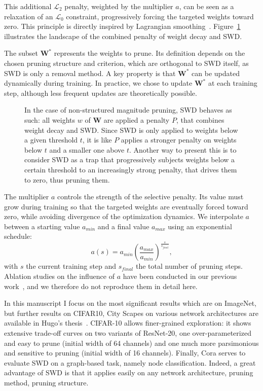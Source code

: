 \documentclass[11pt]{report}
\begin{document}
This additional $\mathcal{L}_2$ penalty, weighted by the multiplier $a$, can be seen as a relaxation of an $\mathcal{L}_0$ constraint, progressively forcing the targeted weights toward zero. This principle is directly inspired by Lagrangian smoothing~\cite{murray2010algorithm}. Figure~\ref{fig:swd_illustration} illustrates the landscape of the combined penalty of weight decay and SWD.

The subset $\mathbf{W}^*$ represents the weights to prune. Its definition depends on the chosen pruning structure and criterion, which are orthogonal to SWD itself, as SWD is only a removal method. A key property is that $\mathbf{W}^*$ can be updated dynamically during training. In practice, we chose to update $\mathbf{W}^*$ at each training step, although less frequent updates are theoretically possible.

\begin{figure}[t]
  \centering
  
  \caption{In the case of non-structured magnitude pruning, SWD behaves as such: all weights $w$ of $\mathbf{W}$ are applied a penalty $P$, that combines weight decay and SWD. Since SWD is only applied to weights below a given threshold $t$, it is like $P$ applies a stronger penalty on weights below $t$ and a smaller one above $t$. Another way to present this is to consider SWD as a trap that progressively subjects weights below a certain threshold to an increasingly strong penalty, that drives them to zero, thus pruning them.}
  \label{fig:swd_illustration}
\end{figure}
The multiplier $a$ controls the strength of the selective penalty. Its value must grow during training so that the targeted weights are eventually forced toward zero, while avoiding divergence of the optimization dynamics. We interpolate $a$ between a starting value $a_{min}$ and a final value $a_{max}$ using an exponential schedule:
\begin{equation}
  a(s) = a_{min} \left( \frac{a_{max}}{a_{min}} \right)^{\frac{s}{s_{final}}},
  \label{eq:a_definition}
\end{equation}
with $s$ the current training step and $s_{final}$ the total number of pruning steps. Ablation studies on the influence of $a$ have been conducted in our previous work~\cite{tessier:hal-03675138}, and we therefore do not reproduce them in detail here.

In this manuscript I focus on the most significant results which are on ImageNet, but further results on CIFAR10, City Scapes on various network architectures are available in Hugo's thesis~\cite{tessier:tel-04064137}. CIFAR-10 allows finer-grained exploration: it shows extensive trade-off curves on two variants of ResNet-20, one over-parameterized and easy to prune (initial width of 64 channels) and one much more parsimonious and sensitive to pruning (initial width of 16 channels). Finally, Cora serves to evaluate SWD on a graph-based task, namely node classification. Indeed, a great advantage of SWD is that it applies easily on any network architecture, pruning method, pruning structure.
\end{document}
